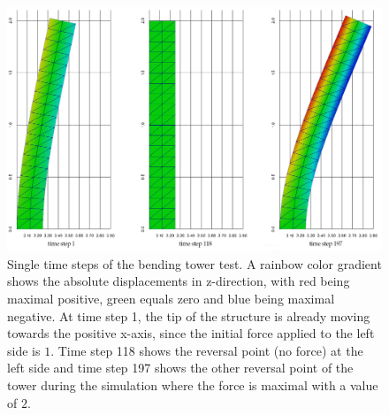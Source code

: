   \begin{landscape}
   \begin{figure}[htbp]
    \centering
    \includegraphics[width=0.8\linewidth]{figures/frames}
    \caption{Single time steps of the bending tower test. A rainbow color gradient shows the absolute displacements in z-direction, with red being maximal positive, green equals zero and blue being maximal negative. At time step 1, the tip of the structure is already moving towards the positive x-axis, since the initial force applied to the left side is $1$. Time step 118 shows the reversal point (no force) at the left side and time step 197 shows the other reversal point of the tower during the simulation where the force is maximal with a value of $2$.}
    \label{fig:testHa2}
   \end{figure}
  \end{landscape}
  
